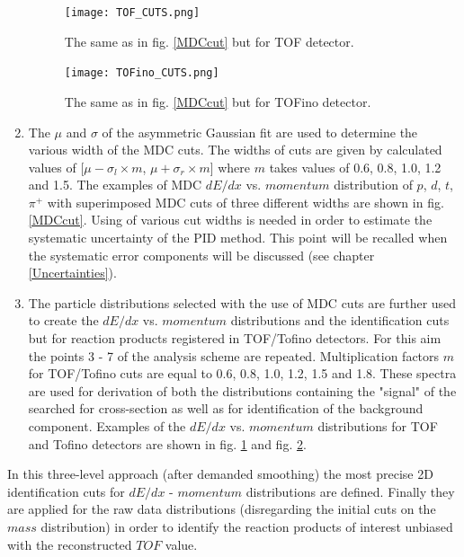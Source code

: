 \begin{enumerate}
   \begin{figure}[!ht]
   	\centering
   	\texttt{[image: TOF\_CUTS.png]}
   	\caption{The same as in fig.  \ref{MDCcut} but for TOF detector. 
    }
   	\label{TOFcut}
   \end{figure}
 

   \begin{figure}[!ht]
   	\centering
   	\texttt{[image: TOFino\_CUTS.png]}
   	\caption{The same as in fig.  \ref{MDCcut} but for TOFino detector.
    }
   	\label{TOFinocut}
   \end{figure}
   \item The $\mu$ and $\sigma$ of the asymmetric Gaussian fit are used to determine the various width of the MDC cuts. 
   The widths of cuts are given by calculated values of [$\mu - \sigma_l \times m$, $\mu + \sigma_r \times m$]  
   where $m$ takes values of 0.6, 0.8, 1.0, 1.2 and 1.5. The examples of MDC $dE/dx$ vs. $momentum$ distribution of $p$, $d$, $t$, $\pi^+$
   with superimposed MDC cuts of three different widths are shown in fig. \ref{MDCcut}. 
   Using of various cut widths is needed in order to estimate the systematic uncertainty of the PID method. This point will be recalled when
   the systematic error components will be discussed (see chapter \ref{Uncertainties}).
  \item The particle distributions selected with the use of MDC cuts are further used to create the $dE/dx$ vs. $momentum$ distributions 
  and the identification cuts but for reaction products registered in TOF/Tofino detectors.
  For this aim the points 3 - 7 of the analysis scheme are repeated. Multiplication 
  factors $m$ 
  for TOF/Tofino cuts are equal to 0.6, 0.8, 1.0, 1.2, 1.5 and 1.8. These spectra are used for derivation of both the distributions containing the 
  "signal" of the searched for cross-section as well as for identification of the background component. Examples 
  of the $dE/dx$ vs. $momentum$ distributions for TOF and Tofino detectors are shown in fig. \ref{TOFcut} and fig. \ref{TOFinocut}. 
    
  \end{enumerate}
  
  In this three-level approach (after demanded smoothing) the most precise 2D identification cuts for $dE/dx$ - $momentum$ distributions are defined.
  Finally they are applied for the raw data distributions (disregarding the initial cuts on the $mass$ distribution)  in order to identify the reaction products of interest
  unbiased with the reconstructed $TOF$ value. 

